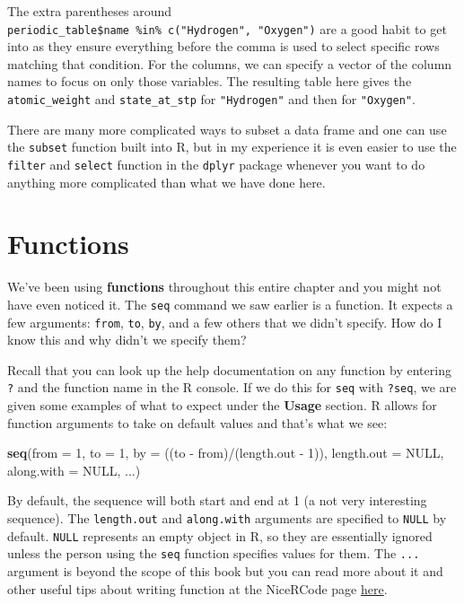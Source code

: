 \documentclass[]{tufte-book}
\newenvironment{Shaded}{\begin{snugshade}}{\end{snugshade}}
\newcommand{\KeywordTok}[1]{\textcolor[rgb]{0.13,0.29,0.53}{\textbf{{#1}}}}
\newcommand{\DataTypeTok}[1]{\textcolor[rgb]{0.13,0.29,0.53}{{#1}}}
\newcommand{\DecValTok}[1]{\textcolor[rgb]{0.00,0.00,0.81}{{#1}}}
\newcommand{\StringTok}[1]{\textcolor[rgb]{0.31,0.60,0.02}{{#1}}}
\newcommand{\OtherTok}[1]{\textcolor[rgb]{0.56,0.35,0.01}{{#1}}}
\newcommand{\NormalTok}[1]{{#1}}
\begin{document}
The extra parentheses around
\texttt{periodic\_table\$name\ \%in\%\ c("Hydrogen",\ "Oxygen")} are a
good habit to get into as they ensure everything before the comma is
used to select specific rows matching that condition. For the columns,
we can specify a vector of the column names to focus on only those
variables. The resulting table here gives the \texttt{atomic\_weight}
and \texttt{state\_at\_stp} for \texttt{"Hydrogen"} and then for
\texttt{"Oxygen"}.

There are many more complicated ways to subset a data frame and one can
use the \texttt{subset} function built into R, but in my experience it
is even easier to use the \texttt{filter} and \texttt{select} function
in the \texttt{dplyr} package whenever you want to do anything more
complicated than what we have done here.

\section{Functions}\label{functions}

We've been using \textbf{functions} throughout this entire chapter and
you might not have even noticed it. The \texttt{seq} command we saw
earlier is a function. It expects a few arguments: \texttt{from},
\texttt{to}, \texttt{by}, and a few others that we didn't specify. How
do I know this and why didn't we specify them?

Recall that you can look up the help documentation on any function by
entering \texttt{?} and the function name in the R console. If we do
this for \texttt{seq} with \texttt{?seq}, we are given some examples of
what to expect under the \textbf{Usage} section. R allows for function
arguments to take on default values and that's what we see:

\begin{Shaded}
\begin{Highlighting}[]
\KeywordTok{seq}\NormalTok{(}\DataTypeTok{from =} \DecValTok{1}\NormalTok{, }\DataTypeTok{to =} \DecValTok{1}\NormalTok{, }\DataTypeTok{by =} \NormalTok{((to -}\StringTok{ }\NormalTok{from)/(length.out -}\StringTok{ }\DecValTok{1}\NormalTok{)),}
    \DataTypeTok{length.out =} \OtherTok{NULL}\NormalTok{, }\DataTypeTok{along.with =} \OtherTok{NULL}\NormalTok{, ...)}
\end{Highlighting}
\end{Shaded}

By default, the sequence will both start and end at 1 (a not very
interesting sequence). The \texttt{length.out} and \texttt{along.with}
arguments are specified to \texttt{NULL} by default. \texttt{NULL}
represents an empty object in R, so they are essentially ignored unless
the person using the \texttt{seq} function specifies values for them.
The \texttt{...} argument is beyond the scope of this book but you can
read more about it and other useful tips about writing function at the
NiceRCode page
\href{http://nicercode.github.io/guides/functions/}{here}.
\end{document}
